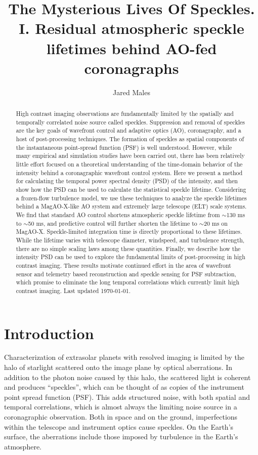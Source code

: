\documentclass[11pt,preprint]{aastex}
\begin{document}
\title{The Mysterious Lives Of Speckles. I. Residual atmospheric speckle lifetimes behind AO-fed coronagraphs}
\author{Jared Males}



\begin{abstract}
High contrast imaging observations are fundamentally limited by the spatially and temporally correlated noise source called speckles.  Suppression and removal of speckles are the key goals of wavefront control and adaptive optics (AO), coronagraphy, and a host of post-processing techniques.   The formation of speckles as spatial components of the instantaneous point-spread function (PSF) is well understood. However, while many empirical and simulation studies have been carried out, there has been relatively little effort focused on a theoretical understanding of the time-domain behavior of the intensity behind a coronagraphic wavefront control system.  Here we present a method for calculating the temporal power spectral density (PSD) of the intensity, and then show how the PSD can be used to calculate the statistical speckle lifetime.  Considering a frozen-flow turbulence model, we use these techniques to analyze the speckle lifetimes behind a MagAO-X-like AO system and extremely large telescope (ELT) scale systems.   We find that standard AO control shortens atmospheric speckle lifetime from $\sim$130 ms to $\sim$50 ms, and predictive control will further shorten the lifetime to $\sim$20 ms on MagAO-X.  Speckle-limited integration time is directly proportional to these lifetimes.  While the lifetime varies with telescope diameter, windspeed, and turbulence strength, there are no simple scaling laws among these quantities.   Finally, we describe how the intensity PSD can be used to explore the fundamental limits of post-processing in high contrast imaging.  These results motivate continued effort in the area of wavefront sensor and telemetry based reconstruction and speckle sensing for PSF subtraction, which promise to eliminate the long temporal correlations which currently limit high contrast imaging. Last updated \today.
\end{abstract}

\section{Introduction}

Characterization of extrasolar planets with resolved imaging is limited by the halo of starlight scattered onto the image plane by optical aberrations.  In addition to the photon noise caused by this halo, the scattered light is coherent and produces ``speckles'', which can be thought of as copies of the instrument point spread function (PSF).  This adds structured noise, with both spatial and temporal correlations, which is almost always the limiting noise source in a coronagraphic observation.    Both in space and on the ground, imperfections within the telescope and instrument optics cause speckles.   On the Earth's surface, the aberrations include those imposed by turbulence in the Earth's atmosphere. 
\end{document}
